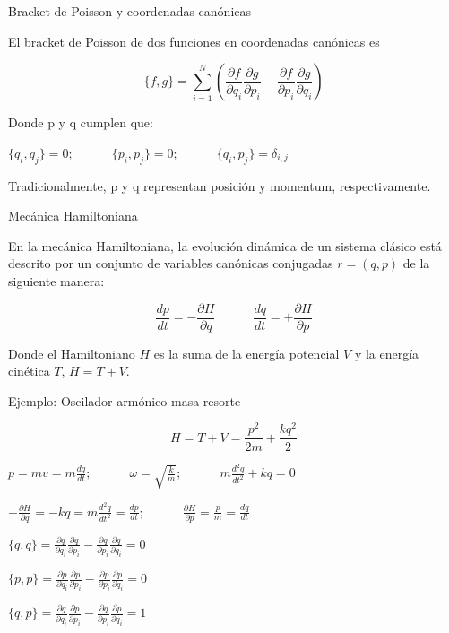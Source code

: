\begin{frame}{Bracket de Poisson y coordenadas canónicas}
\protect\hypertarget{bracket-de-poisson-y-coordenadas-canuxf3nicas}{}

El bracket de Poisson de dos funciones en coordenadas canónicas es

\[\{f,g\} = \sum\limits_{i=1}^N (\frac{\partial f}{\partial q_i}
 \frac{\partial g}{\partial p_i} - \frac{\partial f}{\partial p_i}
 \frac{\partial g}{\partial q_i})\]

Donde p y q cumplen que:

\(\{q_i,q_j\}=0; \qquad \quad \{p_i,p_j\}=0; \qquad \quad  \{q_i,p_j\}=\delta_{i,j}\)

Tradicionalmente, p y q representan posición y momentum,
respectivamente.

\end{frame}

\begin{frame}{Mecánica Hamiltoniana}
\protect\hypertarget{mecuxe1nica-hamiltoniana}{}

En la mecánica Hamiltoniana, la evolución dinámica de un sistema clásico
está descrito por un conjunto de variables canónicas conjugadas
\(r=(q,p)\) de la siguiente manera:

\[\frac{dp}{dt}=-\frac{\partial H}{\partial q} \qquad \quad 
 \frac{dq}{dt}=+\frac{\partial H}{\partial p}\]

Donde el Hamiltoniano \(H\) es la suma de la energía potencial \(V\) y
la energía cinética \(T\), \(H=T+V\).

\end{frame}

\begin{frame}{Ejemplo: Oscilador armónico masa-resorte}
\protect\hypertarget{ejemplo-oscilador-armuxf3nico-masa-resorte}{}

\[H=T+V=\frac{p^2}{2m}+\frac{k q^2}{2}\]

\(p=mv=m \frac{dq}{dt}; \qquad \quad \omega=\sqrt{\frac{k}{m}}; \qquad \quad  m \frac{d^2q}{dt^2} + k q=0\)

\(-\frac{\partial H}{\partial q} = -k q = m \frac{d^2q}{dt^2} = \frac{dp}{dt};  \qquad \quad \frac{\partial H}{\partial p} = \frac{p}{m} = \frac{dq}{dt}\)

\(\{q,q\} = \frac{\partial q}{\partial q_i}  \frac{\partial q}{\partial p_i} - \frac{\partial q}{\partial p_i}  \frac{\partial q}{\partial q_i} = 0\)

\(\{p,p\} = \frac{\partial p}{\partial q_i}  \frac{\partial p}{\partial p_i} - \frac{\partial p}{\partial p_i}  \frac{\partial p}{\partial q_i} = 0\)

\(\{q,p\} = \frac{\partial q}{\partial q_i}  \frac{\partial p}{\partial p_i} - \frac{\partial q}{\partial p_i}  \frac{\partial p}{\partial q_i} = 1\)

\end{frame}

